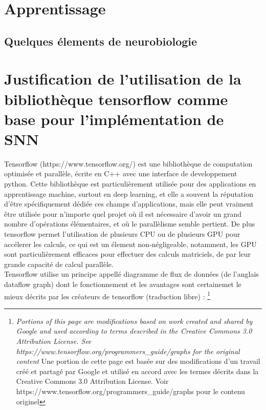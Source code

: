 \documentclass[12pt]{scrartcl}
\begin{document}
\section{Apprentissage}
\subsection{Quelques élements de neurobiologie}

\section{Justification de l'utilisation de la bibliothèque tensorflow comme base pour l'implémentation de SNN}
Tensorflow (https://www.tensorflow.org/) est une bibliothèque de computation optimisée et parallèle, écrite en C++ avec une interface de developpement python. Cette bibliothèque est particulièrement utilisée pour des applications en apprentissage machine, surtout en deep learning, et elle a souvent la réputation d'être spécifiquement dédiée ces champs d'applications, mais elle peut vraiment être utilisée pour n'importe quel projet où il est nécessaire d'avoir un grand nombre d'opérations élémentaires, et où le parallèlisme semble pertient. De plus tensorflow permet l'utilisation de plusieurs CPU ou de plusieurs GPU pour accélerer les calculs, ce qui est un élement non-négligeable, notamment, les GPU sont particulièrement efficaces pour effectuer des calculs matriciels, de par leur grande capacité de calcul parallèle.\\

Tensorflow utilise un principe appellé diagramme de flux de données (de l'anglais dataflow graph) dont le fonctionnement et les avantages sont certainemet le mieux décrits par les créateurs de tensorflow (traduction libre) : \footnote{\textit{Portions of this page are modifications based on work created and shared by Google and used according to terms described in the Creative Commons 3.0 Attribution License. See https://www.tensorflow.org/programmers\_guide/graphs for the original content} Une portion de cette page est basée sur des modifications d'un travail créé et partagé par Google et utilisé en accord avec les termes décrits dans la Creative Commons 3.0 Attribution License. Voir https://www.tensorflow.org/programmers\_guide/graphs pour le contenu originel }

\textit{
}
\end{document}
